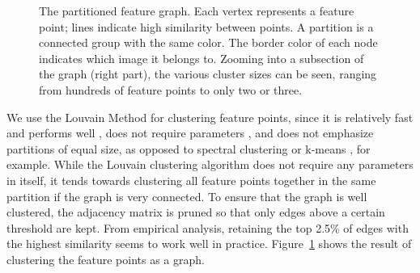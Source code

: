 \documentclass{article}
\begin{document}
\begin{figure}[t]
    \centering
{}
    \caption{The partitioned feature graph. Each vertex represents a 
        feature point; lines indicate high similarity between points. A 
        partition is a connected group with the same color. The border 
        color of each node indicates which image it belongs to.  Zooming 
    into a subsection of the graph (right part), the various cluster 
sizes can be seen, ranging from hundreds of feature points to only two 
or three.}
	\label{fig:graph}
\end{figure}

We use the Louvain Method \cite{blondel2008} for clustering feature 
points, since it is relatively fast and performs well 
\cite{lancichinetti2009}, does not require parameters 
\cite{blondel2008}, and does not emphasize partitions of equal size, as 
opposed to spectral clustering or k-means \cite{von2007}, for example.
While the Louvain clustering algorithm does not require any parameters 
in itself, it tends towards clustering all feature points together in 
the same partition if the graph is very connected.  To ensure that the 
graph is well clustered, the adjacency matrix is pruned so that only 
edges above a certain threshold are kept. From empirical analysis, 
retaining the top 2.5\% of edges with the highest similarity seems to 
work well in practice. Figure~\ref{fig:graph} shows the result of 
clustering the feature points as a graph.
%
\end{document}
